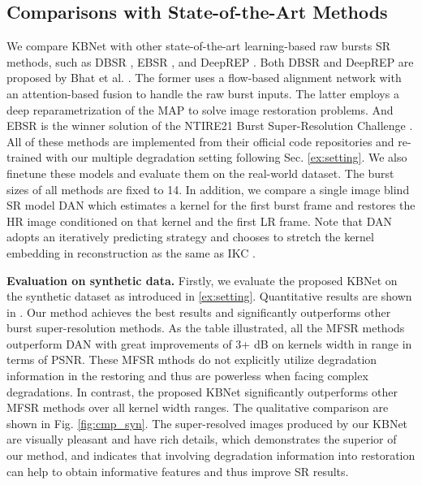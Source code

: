 \subsection{Comparisons with State-of-the-Art Methods}

We compare KBNet with other state-of-the-art learning-based raw bursts SR methods, such as DBSR \cite{bhat2021deep}, EBSR \cite{luo2021ebsr}, and DeepREP \cite{bhat2021deepre}. Both DBSR and DeepREP are proposed by Bhat et al. \cite{bhat2021deep,bhat2021deepre}. The former uses a flow-based alignment network with an attention-based fusion to handle the raw burst inputs. The latter employs a deep reparametrization of the MAP to solve image restoration problems. And EBSR is the winner solution of the NTIRE21 Burst Super-Resolution Challenge \cite{bhat2021ntire}. All of these methods are implemented from their official code repositories and re-trained with our multiple degradation setting following Sec. \ref{ex:setting}. We also finetune these models and evaluate them on the real-world dataset. The burst sizes of all methods are fixed to 14. In addition, we compare a single image blind SR model DAN \cite{luo2020unfolding} which estimates a kernel for the first burst frame and restores the HR image conditioned on that kernel and the first LR frame. Note that DAN adopts an iteratively predicting strategy and chooses to stretch the kernel embedding in reconstruction as the same as IKC \cite{gu2019blind}.











\noindent \textbf{Evaluation on synthetic data.}
Firstly, we evaluate the proposed KBNet on the synthetic dataset as introduced in \cref{ex:setting}. Quantitative results are shown in . Our method achieves the best results and significantly outperforms other burst super-resolution methods. 
As the table illustrated, all the MFSR methods outperform DAN \cite{luo2020unfolding} with great improvements of 3+ dB on kernels width in range  in terms of PSNR. These MFSR mthods do not explicitly utilize degradation information in the restoring and thus are powerless when facing complex degradations. In contrast, the proposed KBNet significantly outperforms other MFSR methods over all kernel width ranges. The qualitative comparison are shown in Fig. \ref{fig:cmp_syn}. 
The super-resolved images produced by our KBNet are visually pleasant and have rich details, which demonstrates the superior of our method, and indicates that involving degradation information into restoration can help to obtain informative features and thus improve SR results.


